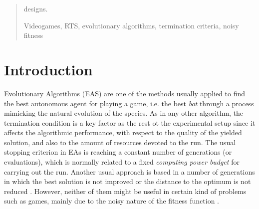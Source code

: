 \documentclass[runningheads,a4paper]{llncs}
\newcommand{\keywords}[1]{\par\addvspace\baselineskip
\noindent\keywordname\enspace\ignorespaces#1}
\begin{document}
\begin{abstract}
designs.
\keywords{Videogames, RTS, evolutionary algorithms, termination criteria, noisy fitness}
\end{abstract}

%
%
\section{Introduction}


Evolutionary Algorithms (EAS) are one of the methods usually applied to find the
 best autonomous agent for playing a game, i.e. the best \textit{bot} \cite{Agent_Smith_CEC2009,bots:evostar,unreal:gecco10,DBLP:conf/cig/Fernandez-AresGMG12} through a process mimicking the natural evolution of the 
species. As in any other algorithm, the termination condition is a key factor 
as the rest ot the experimental setup since it affects the algorithmic 
performance, with respect to the quality of the yielded solution, and also to 
the amount of resources devoted to the run. The usual stopping criterion in EAs 
\cite{EAs_Back96} is reaching a constant number of generations (or 
evaluations), 
 which is normally related to a fixed {\em computing power budget} for carrying out 
the run. Another usual approach is based in a number of generations in which 
the best solution is not improved or the distance to the optimum is not reduced 
\cite{RocheTermination13}. However, neither of them might be useful in certain 
kind of problems such as games, mainly due to the noisy nature of the fitness 
function \cite{merelo14:noisy,bots:evostar}.
\end{document}
